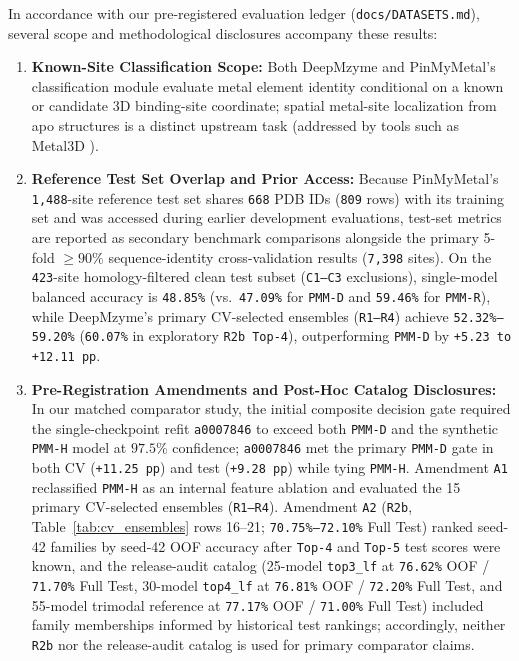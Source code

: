 \documentclass[10pt,a4paper,twocolumn]{article}
\begin{document}
In accordance with our pre-registered evaluation ledger (\texttt{docs/DATASETS.md}), several scope and methodological disclosures accompany these results:
\begin{enumerate}
  \item \textbf{Known-Site Classification Scope:} Both DeepMzyme and PinMyMetal's classification module evaluate metal element identity conditional on a known or candidate 3D binding-site coordinate; spatial metal-site localization from apo structures is a distinct upstream task (addressed by tools such as Metal3D \cite{durr2023metal3d}).
  \item \textbf{Reference Test Set Overlap and Prior Access:} Because PinMyMetal's \texttt{1,488}-site reference test set shares \texttt{668} PDB IDs (\texttt{809} rows) with its training set and was accessed during earlier development evaluations, test-set metrics are reported as secondary benchmark comparisons alongside the primary 5-fold $\ge 90\%$ sequence-identity cross-validation results (\texttt{7,398} sites). On the \texttt{423}-site homology-filtered clean test subset (\texttt{C1--C3} exclusions), single-model balanced accuracy is \texttt{48.85\%} (vs.\ \texttt{47.09\%} for \texttt{PMM-D} and \texttt{59.46\%} for \texttt{PMM-R}), while DeepMzyme's primary CV-selected ensembles (\texttt{R1--R4}) achieve \texttt{52.32\%--59.20\%} (\texttt{60.07\%} in exploratory \texttt{R2b Top-4}), outperforming \texttt{PMM-D} by \texttt{+5.23 to +12.11 pp}.
  \item \textbf{Pre-Registration Amendments and Post-Hoc Catalog Disclosures:} In our matched comparator study, the initial composite decision gate required the single-checkpoint refit \texttt{a0007846} to exceed both \texttt{PMM-D} and the synthetic \texttt{PMM-H} model at $97.5\%$ confidence; \texttt{a0007846} met the primary \texttt{PMM-D} gate in both CV (\texttt{+11.25 pp}) and test (\texttt{+9.28 pp}) while tying \texttt{PMM-H}. Amendment \texttt{A1} reclassified \texttt{PMM-H} as an internal feature ablation and evaluated the 15 primary CV-selected ensembles (\texttt{R1--R4}). Amendment \texttt{A2} (\texttt{R2b}, Table~\ref{tab:cv_ensembles} rows 16--21; \texttt{70.75\%--72.10\%} Full Test) ranked seed-42 families by seed-42 OOF accuracy after \texttt{Top-4} and \texttt{Top-5} test scores were known, and the release-audit catalog (25-model \texttt{top3\_lf} at \texttt{76.62\%} OOF / \texttt{71.70\%} Full Test, 30-model \texttt{top4\_lf} at \texttt{76.81\%} OOF / \texttt{72.20\%} Full Test, and 55-model trimodal reference at \texttt{77.17\%} OOF / \texttt{71.00\%} Full Test) included family memberships informed by historical test rankings; accordingly, neither \texttt{R2b} nor the release-audit catalog is used for primary comparator claims.
\end{enumerate}
\end{document}
